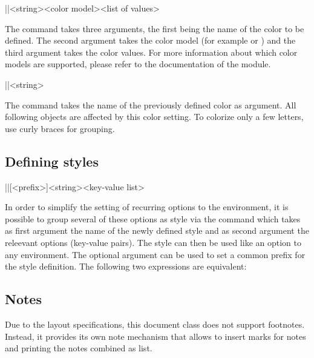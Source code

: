 \documentclass[a4paper]{article}
\begin{document}
\begin{macrodef}
|\leporellocolordefine|{<string>}{<color model>}{<list of values>}
\end{macrodef}
The command \macro{\leporellocolordefine} takes three arguments, the first being the name of the color to be defined. The second argument takes the color model (for example  or ) and the third argument takes the color values. For more information about which color models are supported, please refer to the documentation of the  module.

\begin{macrodef}
|\leporellocolorselect|{<string>}
\end{macrodef}
The command \macro{\leporellocolorselect} takes the name of the previously defined color as argument. All following objects are affected by this color setting. To colorize only a few letters, use curly braces for grouping.

\subsection{Defining styles}

\begin{macrodef}
|\leporellosetstyle|[<prefix>]{<string>}{<key-value list>}
\end{macrodef}
In order to simplify the setting of recurring options to the  environment, it is possible to group several of these options as style via the \macro{\leporellosetstyle} command which takes as first argument the name of the newly defined style and as second argument the releevant options (key-value pairs). The style can then be used like an option to any  environment. The optional argument can be used to set a common prefix for the style definition. The following two expressions are equivalent:

\begin{codeexample}

\end{codeexample}

\subsection{Notes}

Due to the layout specifications, this document class does not support footnotes. Instead, it provides its own note mechanism that allows to insert marks for notes and printing the notes combined as list.
\end{document}
